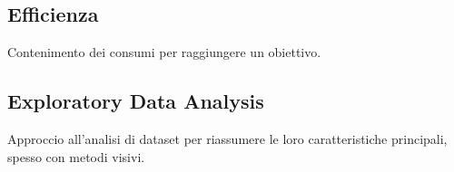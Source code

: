 \documentclass[../glossario.tex]{subfiles}
\begin{document}
\subsection*{Efficienza}
Contenimento dei consumi per raggiungere un obiettivo.

\subsection*{Exploratory Data Analysis}
Approccio all'analisi di dataset per riassumere le loro caratteristiche principali, spesso con metodi visivi.

    
\end{document}
